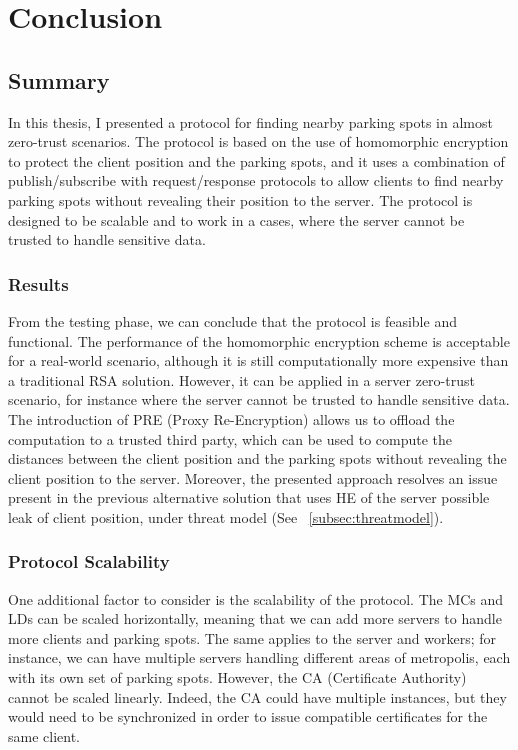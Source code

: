 \chapter{Conclusion} \label{chap:conclusion}

\section{Summary}

In this thesis, I presented a protocol for finding nearby parking spots in almost zero-trust scenarios. The protocol is based on the use of homomorphic encryption to protect the client position and the parking spots, and it uses a combination of publish/subscribe with request/response protocols to allow clients to find nearby parking spots without revealing their position to the server. The protocol is designed to be scalable and to work in a cases, where the server cannot be trusted to handle sensitive data.

\subsection{Results}

From the testing phase, we can conclude that the protocol is feasible and functional. The performance of the homomorphic encryption scheme is acceptable for a real-world scenario, although it is still computationally more expensive than a traditional RSA solution. However, it can be applied in a server zero-trust scenario, for instance where the server cannot be trusted to handle sensitive data. The introduction of PRE (Proxy Re-Encryption) allows us to offload the computation to a trusted third party, which can be used to compute the distances between the client position and the parking spots without revealing the client position to the server. Moreover, the presented approach resolves an issue present in the previous alternative solution that uses HE of the server possible leak of client position, under threat model (See ~\cref{subsec:threatmodel}).

\subsection{Protocol Scalability}

One additional factor to consider is the scalability of the protocol. The MCs and LDs can be scaled horizontally, meaning that we can add more servers to handle more clients and parking spots. The same applies to the server and workers; for instance, we can have multiple servers handling different areas of metropolis, each with its own set of parking spots. However, the CA (Certificate Authority) cannot be scaled linearly. Indeed, the CA could have multiple instances, but they would need to be synchronized in order to issue compatible certificates for the same client.

